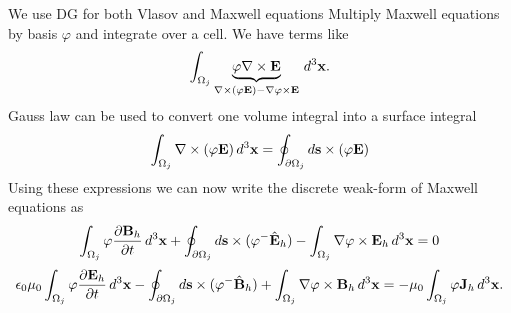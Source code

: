 \documentclass[pdf]{beamer}
\newcommand{\pfrac}[2]{\frac{\partial #1}{\partial #2}}
\newcommand{\mvec}[1]{\mathbf{#1}}
\newcommand{\dtx}{\thinspace d^3\mvec{x}}
\theoremstyle{definition}
\begin{document}
\begin{frame}{We use DG for both Vlasov and Maxwell equations}
  \small Multiply Maxwell equations by basis $\varphi$ and integrate
  over a cell.  We have terms like
  \begin{align*}
    \int_{\Omega_j} 
    \underbrace{
    \varphi\nabla\times\mvec{E}
  }_{
    \nabla\times(\varphi\mvec{E}) - \nabla\varphi\times\mvec{E}
    }
    \dtx.
  \end{align*}
  Gauss law can be used to convert one volume integral into a surface
  integral
  \begin{align*}
    \int_{\Omega_j} \nabla\times(\varphi\mvec{E}) \dtx
    =
    \oint_{\partial\Omega_j} d\mvec{s}\times(\varphi\mvec{E})
  \end{align*}
  Using these expressions we can now write the discrete weak-form of
  Maxwell equations as
  \begin{align*}
    \int_{\Omega_j}\varphi \pfrac{\mvec{B}_h}{t}\dtx
    +
    \oint_{\partial\Omega_j} d\mvec{s}\times(\varphi^-\hat{\mvec{E}}_h)
    -
    \int_{\Omega_j} \nabla\varphi\times\mvec{E}_h \dtx
    =
    0
  \end{align*}
  \begin{align*}
    \epsilon_0\mu_0\int_{\Omega_j}\varphi \pfrac{\mvec{E}_h}{t}\dtx
    -
    \oint_{\partial\Omega_j} d\mvec{s}\times(\varphi^-\hat{\mvec{B}}_h)
    +
    \int_{\Omega_j} \nabla\varphi\times\mvec{B}_h \dtx
    =
    -\mu_0\int_{\Omega_j} \varphi \mvec{J}_h\dtx.
  \end{align*}

\end{frame}
\end{document}
